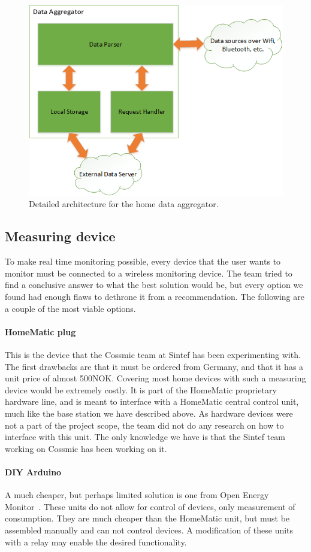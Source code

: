 \begin{figure}[H]
\centering
\includegraphics[height=0.4\textheight]{ch/further/fig/home.png}
\caption{Detailed architecture for the home data aggregator.}
\label{fig:aggregator}
\end{figure}

\subsection{Measuring device}
To make real time monitoring possible, every device that the user wants to monitor must be connected to a wireless monitoring device. The team tried to find a conclusive answer to what the best solution would be, but every option we found had enough flaws to dethrone it from a recommendation. The following are a couple of the most viable options.

\paragraph{HomeMatic plug}
This is the device that the Cossmic team at Sintef has been experimenting with. The first drawbacks are that it must be ordered from Germany, and that it has a unit price of almost 500NOK. Covering most home devices with such a measuring device would be extremely costly. It is part of the HomeMatic proprietary hardware line, and is meant to interface with a HomeMatic central control unit, much like the base station we have described above. As hardware devices were not a part of the project scope, the team did not do any research on how to interface with this unit. The only knowledge we have is that the Sintef team working on Cossmic has been working on it.

\paragraph{DIY Arduino}
A much cheaper, but perhaps limited solution is one from Open Energy Monitor~\cite{oemmodule}. These units do not allow for control of devices, only measurement of consumption. They are much cheaper than the HomeMatic unit, but must be assembled manually and can not control devices. A modification of these units with a relay may enable the desired functionality.